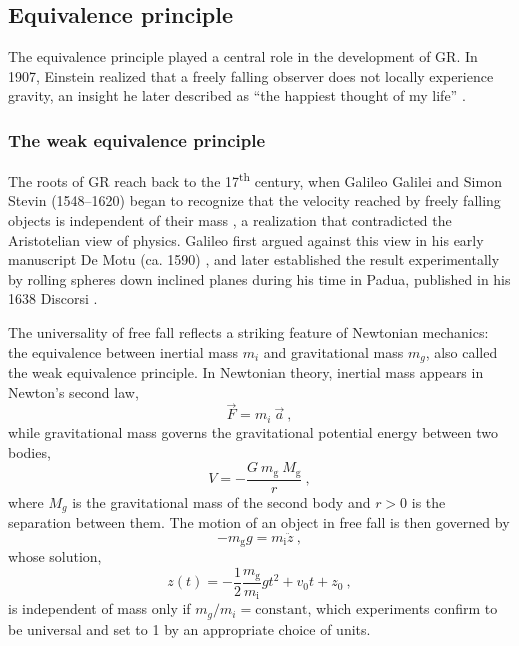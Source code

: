 \subsection{Equivalence principle}

The equivalence principle played a central role in the development of GR. In 1907, Einstein realized that a freely falling observer does not locally experience gravity, an insight he later described as ``the happiest thought of my life'' \cite{Happiestthoughtofmylife, QuoteEinstein_Pais}.


\subsubsection{The weak equivalence principle}

The roots of GR reach back to the 17\textsuperscript{th} century, when Galileo Galilei and
Simon Stevin (1548--1620) began to recognize that the velocity reached by freely falling objects
is independent of their mass \cite{LlibreBertJanssen}, a realization that contradicted the
Aristotelian view of physics. Galileo first argued against this view in his early manuscript De Motu (ca. 1590) \cite{DeMotuGalilei}, and later established the result experimentally by rolling spheres down inclined planes during his time in Padua, published in his 1638 Discorsi \cite{GalileoDiscorsi1638}.

The universality of free fall reflects a striking feature of Newtonian mechanics: the equivalence
between inertial mass $m_i$ and gravitational mass $m_g$, also called the weak equivalence
principle. In Newtonian theory, inertial mass appears in Newton's second law,
\begin{equation}
    \vec{F}=m_i \ \vec{a} \ ,
\end{equation}
while gravitational mass governs the gravitational potential energy between two bodies,
\begin{equation}
    V=-\frac{G \ m_{\mathrm{g}} \ M_{\mathrm{g}}}{r} \ ,
\end{equation}
where $M_g$ is the gravitational mass of the second body and $r>0$ is the separation between them.
The motion of an object in free fall is then governed by
\begin{equation}
    -m_{\mathrm{g}} g=m_{\mathrm{i}} \ddot{z} \ ,
\end{equation}
whose solution,
\begin{equation}
    z(t)=-\frac{1}{2} \frac{m_{\mathrm{g}}}{m_{\mathrm{i}}} g t^2+v_0 t+z_0 \ ,
\end{equation}
is independent of mass only if $m_g/m_i = \text{constant}$, which experiments confirm to be
universal and set to 1 by an appropriate choice of units.

